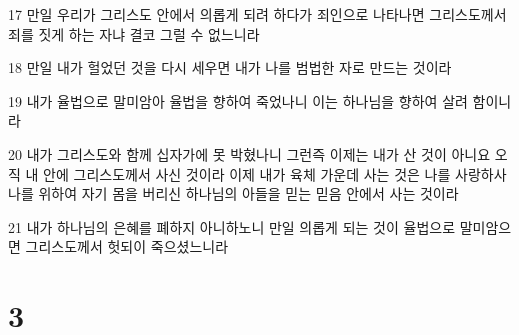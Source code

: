 \par 17 만일 우리가 그리스도 안에서 의롭게 되려 하다가 죄인으로 나타나면 그리스도께서 죄를 짓게 하는 자냐 결코 그럴 수 없느니라
\par 18 만일 내가 헐었던 것을 다시 세우면 내가 나를 범법한 자로 만드는 것이라
\par 19 내가 율법으로 말미암아 율법을 향하여 죽었나니 이는 하나님을 향하여 살려 함이니라
\par 20 내가 그리스도와 함께 십자가에 못 박혔나니 그런즉 이제는 내가 산 것이 아니요 오직 내 안에 그리스도께서 사신 것이라 이제 내가 육체 가운데 사는 것은 나를 사랑하사 나를 위하여 자기 몸을 버리신 하나님의 아들을 믿는 믿음 안에서 사는 것이라
\par 21 내가 하나님의 은혜를 폐하지 아니하노니 만일 의롭게 되는 것이 율법으로 말미암으면 그리스도께서 헛되이 죽으셨느니라

\chapter{3}

